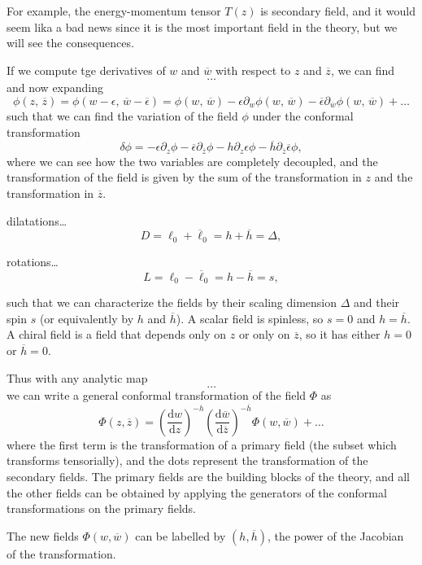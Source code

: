 For example, the energy-momentum tensor \(T(z)\) is secondary field, and it would seem lika a bad news since it is the most important field in the theory, but we will see the consequences.

If we compute tge derivatives of \(w\) and \(\overline{w}\) with respect to \(z\) and \(\overline{z}\), we can find
\[
    \dots
\]
and now expanding
\[
    \phi(z, \, \overline{z}) = \phi(w - \epsilon, \, \overline{w} - \overline{\epsilon}) = \phi(w, \, \overline{w}) - \epsilon \partial_w \phi(w, \, \overline{w}) - \overline{\epsilon} \partial_{\overline{w}} \phi(w, \, \overline{w}) + \dots
\]
such that we can find the variation of the field \(\phi\) under the conformal transformation
\[
    \delta \phi = - \epsilon \partial_z \phi - \overline{\epsilon} \partial_{\overline{z}} \phi - h \partial_z \epsilon \phi - \overline{h} \partial_{\overline{z}} \overline{\epsilon} \phi,
\]
where we can see how the two variables are completely decoupled, and the transformation of the field is given by the sum of the transformation in \(z\) and the transformation in \(\overline{z}\).

dilatations\dots
\[
    D = \ell_0 + \overline{\ell}_0 = h + \overline{h} = \Delta,
\]

rotations\dots
\[
    L = \ell_0 - \overline{\ell}_0 = h - \overline{h} = s,
\]

such that we can characterize the fields by their scaling dimension \(\Delta\) and their spin \(s\) (or equivalently by \(h\) and \(\overline{h}\)). A scalar field is spinless, so \(s=0\) and \(h = \overline{h}\). A chiral field is a field that depends only on \(z\) or only on \(\overline{z}\), so it has either \(h=0\) or \(\overline{h}=0\).




Thus with any analytic map
\[
    \dots
\]
we can write a general conformal transformation of the field \(\Phi\) as
\[
    \Phi(z, \overline{z}) = \left(\frac{\mathrm{d} w}{\mathrm{d} z} \right)^{-h} \left(\frac{\mathrm{d} \overline{w}}{\mathrm{d} \overline{z}} \right)^{-\overline{h}} \Phi(w, \overline{w}) + \dots
\]
where the first term is the transformation of a primary field (the subset which transforms tensorially), and the dots represent the transformation of the secondary fields. The primary fields are the building blocks of the theory, and all the other fields can be obtained by applying the generators of the conformal transformations on the primary fields.

The new fields \(\Phi(w, \overline{w})\) can be labelled by \((h, \overline{h})\), the power of the Jacobian of the transformation.

